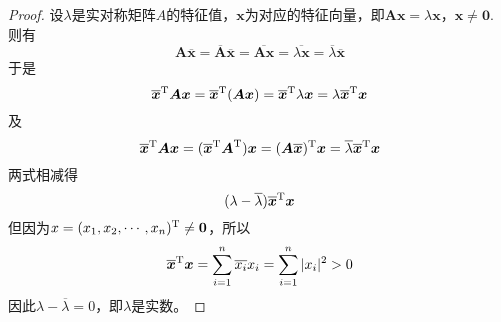 \begin{proof}

    设$\lambda$是实对称矩阵$A$的特征值，$\boldsymbol{x}$为对应的特征向量，即$\boldsymbol{Ax} = \lambda \boldsymbol{x}$，$\boldsymbol{x} \neq \boldsymbol{0}$. \\
    则有
    $$\boldsymbol{A\overline{x}} = \boldsymbol{\overline{A}}\boldsymbol{\overline{x}} = \boldsymbol{\overline{Ax}} = \overline{\lambda\boldsymbol{x}} = \overline{\lambda}\boldsymbol{\overline{x}}$$
    于是
    $$\boldsymbol{\overline{x}}^{\mathrm{T}} \boldsymbol{A} \boldsymbol{x} = \boldsymbol{\overline{x}}^{\mathrm{T}} (\boldsymbol{A} \boldsymbol{x}) = \boldsymbol{\overline{x}}^{\mathrm{T}} \lambda \boldsymbol{x} = \lambda \boldsymbol{\overline{x}}^{\mathrm{T}} \boldsymbol{x}$$
    及
    $$\boldsymbol{\overline{x}}^{\mathrm{T}} \boldsymbol{A} \boldsymbol{x} = (\boldsymbol{\overline{x}}^{\mathrm{T}} \boldsymbol{A}^{\mathrm{T}}) \boldsymbol{x} = (\boldsymbol{A} \boldsymbol{\overline{x}})^{\mathrm{T}} \boldsymbol{x} = \overline{\lambda} \boldsymbol{\overline{x}}^{\mathrm{T}} \boldsymbol{x}$$
    两式相减得
    $$(\lambda - \overline{\lambda}) \boldsymbol{\overline{x}}^{\mathrm{T}} \boldsymbol{x}$$
    但因为$x = (x_1, x_2, \cdots , x_n)^{\mathrm{T}}  \neq \boldsymbol{0}$，所以
    $$\boldsymbol{\overline{x}}^{\mathrm{T}} \boldsymbol{x} = \sum\limits_{i = 1}^{n}{\overline{x_i}x_i} = \sum\limits_{i = 1}^{n}{|x_i|^2} > 0$$
    因此$\lambda - \overline{\lambda} = 0$，即$\lambda$是实数。

\end{proof}
